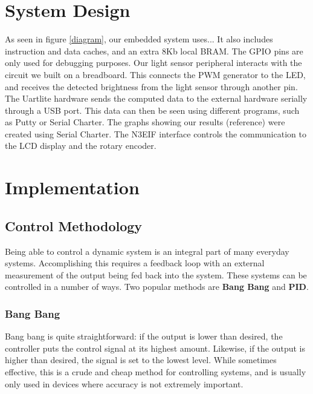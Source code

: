 \documentclass[11pt]{article}
\begin{document}
\section{System Design}
As seen in figure \ref{diagram}, our embedded system uses...
It also includes instruction and data caches, and an extra 
 8Kb local BRAM. 
 The GPIO pins are only used for debugging purposes.
 Our light sensor peripheral interacts with the circuit we built on a breadboard.  This connects the PWM generator to the LED, and receives the detected brightness from the light sensor through another pin. 
 The Uartlite hardware sends the computed data to the external hardware serially through a USB port.  This data can then be seen using different programs, such as Putty or Serial Charter.  The graphs showing our results (reference) were created using Serial Charter. 
 The N3EIF interface controls the communication to the LCD display and the rotary encoder.

\section{Implementation}

\subsection{Control Methodology}
Being able to control a dynamic system is an integral part of many everyday systems.  Accomplishing this requires a feedback loop with an external measurement of the output being fed back into the system.  These systems can be controlled in a number of ways.  Two popular methods are \textbf{Bang Bang} and \textbf{PID}.   

\subsubsection{Bang Bang} 
Bang bang is quite straightforward: if the output is lower than desired, the controller puts the control signal at its highest amount.  Likewise, if the output is higher than desired, the signal is set to the lowest level.  While sometimes effective, this is a crude and cheap method for controlling systems, and is usually only used in devices where accuracy is not extremely important. 

\vspace{12pt}
\end{document}
